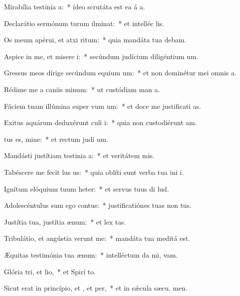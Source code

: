 \item Mirabília testinia a:~* ídeo scrutáta est ea á a.
\item Declarátio sermónum turum ilminat:~* et intelléc  lis.
\item Os meum apérui, et atxi ritum:~* quia mandáta tua debam.
\item Aspice in me, et misere i:~* secúndum judícium diligéntium  um.
\item Gressus meos dírige secúndum equium um:~* et non dominétur mei omnis a.
\item Rédime me a caniis minum:~* ut custódiam man a.
\item Fáciem tuam illúmina super vum um:~* et doce me justificati as.
\item Exitus aquárum deduxérunt culi i:~* quia non custodiérunt  am.
\item {}tus es, mine:~* et rectum judí um.
\item Mandásti justítiam testinia a:~* et veritátem  mis.
\item Tabéscere me fecit lus us:~* quia oblíti sunt verba tua ini i.
\item Ignítum elóquium tuum heter:~* et servus tuus di lud.
\item Adolescéntulus sum ego  contus:~* justificatiónes tuas non  tus.
\item Justítia tua, justítia  ænum:~* et lex  tas.
\item Tribulátio, et angústia verunt me:~* mandáta tua meditá  est.
\item Æquitas testimónia tua  ænum:~* intelléctum da mi,  vam.
\item Glória tri, et lio,~* et Spirí to.
\item Sicut erat in princípio, et , et per,~* et in sǽcula sæcu. men.
